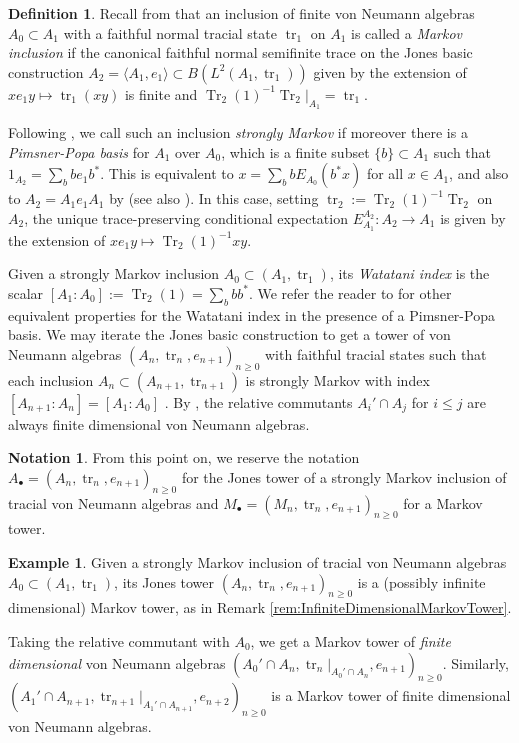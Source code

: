 \documentclass[11pt]{article}
\theoremstyle{plain}
\theoremstyle{definition}
\newtheorem{defn}[thm]{Definition}
\newtheorem{nota}[thm]{Notation}
\newtheorem{ex}[thm]{Example}
\DeclareMathOperator{\Tr}{Tr}
\DeclareMathOperator{\tr}{tr}
\begin{document}
\begin{defn}
\label{def:StronglyMarkovInclusion}
Recall from \cite{MR1278111} that an inclusion of finite von Neumann algebras $A_0\subset A_1$ with a faithful normal tracial state $\tr_1$ on $A_1$ is called a \emph{Markov inclusion} 
if
the canonical faithful normal semifinite trace on the Jones basic construction $A_2 %
= \langle A_1, e_1\rangle \subset B(L^2(A_1, \tr_1))$ given by the extension of $xe_1y \mapsto \tr_1(xy)$ is finite and $\Tr_2(1)^{-1}\Tr_2|_{A_1}=\tr_1$.

Following \cite{MR2812459}, we call such an inclusion \emph{strongly Markov} if moreover there is a \emph{Pimsner-Popa basis} for $A_1$ over $A_0$, which is a finite subset $\{b\}\subset A_1$ such that $1_{A_2} = \sum_b b e_1b^*$.
This is equivalent to $x = \sum_b b E_{A_0}(b^*x)$ for all $x\in A_1$, and also to $A_2 = A_1e_1A_1$ by \cite[Prop.~3(b)]{MR561983}
(see also \cite{MR996807}).
In this case, setting $\tr_2:=\Tr_2(1)^{-1}\Tr_2$ on $A_2$, the unique trace-preserving conditional expectation $E^{A_2}_{A_1}:A_2\to A_1$ is given by the extension of $xe_1y \mapsto \Tr_2(1)^{-1}xy$.

Given a strongly Markov inclusion $A_0\subset (A_1, \tr_1)$, 
its \emph{Watatani index} \cite{MR996807} is the scalar $[A_1:A_0]:=\Tr_2(1) = \sum_b bb^* $.
We refer the reader to \cite[1.1.4(c)]{MR1278111} for other equivalent properties for the Watatani index in the presence of a Pimsner-Popa basis. 
We may iterate the Jones basic construction to get a tower of von Neumann algebras $(A_n ,\tr_n, e_{n+1})_{n\geq 0}$ with faithful tracial states such that each inclusion $A_{n}\subset (A_{n+1}, \tr_{n+1})$ is strongly Markov with index $[A_{n+1}: A_n] = [A_1:A_0]$ \cite{MR2812459}.
By \cite[Prop.~2.7.3]{MR996807}, the relative commutants $A_i' \cap A_j$ for $i\leq j$ are always finite dimensional von Neumann algebras.
\end{defn}

\begin{nota}
From this point on, we reserve the notation $A_\bullet=(A_n,\tr_n, e_{n+1})_{n\geq 0}$ for the Jones tower of a strongly Markov inclusion of tracial von Neumann algebras and $M_\bullet = (M_n, \tr_n, e_{n+1})_{n\geq 0}$ for a Markov tower.
\end{nota}

\begin{ex}
 Given a strongly Markov inclusion of tracial von Neumann algebras $A_0\subset (A_1, \tr_1)$, its Jones tower $(A_n, \tr_n, e_{n+1})_{n\geq 0}$ is a (possibly infinite dimensional) Markov tower, as in Remark \ref{rem:InfiniteDimensionalMarkovTower}.

Taking the relative commutant with $A_0$, we get a Markov tower of \emph{finite dimensional} von Neumann algebras $(A_0'\cap A_n , \tr_n|_{A_0'\cap A_n} , e_{n+1})_{n\geq 0}$.
Similarly, $(A_1'\cap A_{n+1} , \tr_{n+1}|_{A_1'\cap A_{n+1}} , e_{n+2})_{n\geq 0}$ is a Markov tower of finite dimensional von Neumann algebras.
\end{ex}
\end{document}
